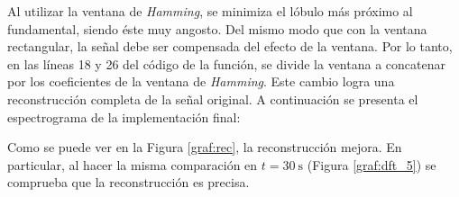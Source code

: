 		Al utilizar la ventana de \textit{Hamming}, se minimiza el lóbulo más próximo al fundamental, siendo éste muy angosto. Del mismo modo que con la ventana rectangular, la señal debe ser compensada del efecto de la ventana. Por lo tanto, en las líneas 18 y 26 del código de la función, se divide la ventana a concatenar por los coeficientes de la ventana de \textit{Hamming}. Este cambio logra una reconstrucción completa de la señal original. A continuación se presenta el espectrograma de la implementación final:\\


		Como se puede ver en la Figura \ref{graf:rec}, la reconstrucción mejora. En particular, al hacer la misma comparación en $t=\SI{30}{\s}$ (Figura \ref{graf:dft_5}) se comprueba que la reconstrucción es precisa.

